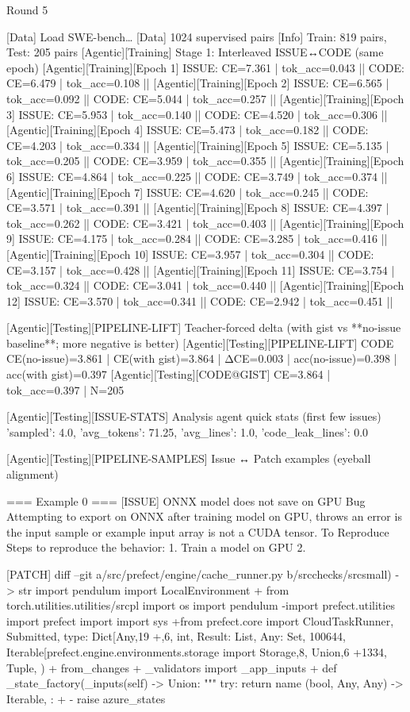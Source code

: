  Round 5
 
 [Data] Load SWE-bench…
 [Data] 1024 supervised pairs
 [Info] Train: 819 pairs, Test: 205 pairs
 [Agentic][Training] Stage 1: Interleaved ISSUE↔CODE (same epoch)
 [Agentic][Training][Epoch 1] ISSUE: CE=7.361 | tok_acc=0.043  ||  CODE: CE=6.479 | tok_acc=0.108  ||  
 [Agentic][Training][Epoch 2] ISSUE: CE=6.565 | tok_acc=0.092  ||  CODE: CE=5.044 | tok_acc=0.257  ||  
 [Agentic][Training][Epoch 3] ISSUE: CE=5.953 | tok_acc=0.140  ||  CODE: CE=4.520 | tok_acc=0.306  ||  
 [Agentic][Training][Epoch 4] ISSUE: CE=5.473 | tok_acc=0.182  ||  CODE: CE=4.203 | tok_acc=0.334  ||  
 [Agentic][Training][Epoch 5] ISSUE: CE=5.135 | tok_acc=0.205  ||  CODE: CE=3.959 | tok_acc=0.355  ||  
 [Agentic][Training][Epoch 6] ISSUE: CE=4.864 | tok_acc=0.225  ||  CODE: CE=3.749 | tok_acc=0.374  ||  
 [Agentic][Training][Epoch 7] ISSUE: CE=4.620 | tok_acc=0.245  ||  CODE: CE=3.571 | tok_acc=0.391  ||  
 [Agentic][Training][Epoch 8] ISSUE: CE=4.397 | tok_acc=0.262  ||  CODE: CE=3.421 | tok_acc=0.403  ||  
 [Agentic][Training][Epoch 9] ISSUE: CE=4.175 | tok_acc=0.284  ||  CODE: CE=3.285 | tok_acc=0.416  ||  
 [Agentic][Training][Epoch 10] ISSUE: CE=3.957 | tok_acc=0.304  ||  CODE: CE=3.157 | tok_acc=0.428  ||  
 [Agentic][Training][Epoch 11] ISSUE: CE=3.754 | tok_acc=0.324  ||  CODE: CE=3.041 | tok_acc=0.440  ||  
 [Agentic][Training][Epoch 12] ISSUE: CE=3.570 | tok_acc=0.341  ||  CODE: CE=2.942 | tok_acc=0.451  ||  
 
 [Agentic][Testing][PIPELINE-LIFT] Teacher-forced delta (with gist vs **no-issue baseline**; more negative is better)
 [Agentic][Testing][PIPELINE-LIFT] CODE CE(no-issue)=3.861 | CE(with gist)=3.864 | ΔCE=0.003 | acc(no-issue)=0.398 | acc(with gist)=0.397
 [Agentic][Testing][CODE@GIST] CE=3.864 | tok_acc=0.397 | N=205
 
 [Agentic][Testing][ISSUE-STATS] Analysis agent quick stats (first few issues)
 {'sampled': 4.0, 'avg_tokens': 71.25, 'avg_lines': 1.0, 'code_leak_lines': 0.0}
 
 [Agentic][Testing][PIPELINE-SAMPLES] Issue ↔ Patch examples (eyeball alignment)
 
 === Example 0 ===
 [ISSUE]
 ONNX model does not save on GPU Bug Attempting to export on ONNX after training model on GPU, throws an error is the input sample or example input array is not a CUDA tensor. To Reproduce Steps to reproduce the behavior: 1. Train a model on GPU 2.
 
 [PATCH]
 diff --git a/src/prefect/engine/cache_runner.py b/srcchecks/srcsmall) -> str import pendulum import LocalEnvironment + from torch.utilities.utilities/srcpl import os import pendulum -import prefect.utilities import prefect import import sys +from prefect.core import CloudTaskRunner, Submitted, type: Dict[Any,19 +,6, int, Result: List, Any: Set, 100644, Iterable[prefect.engine.environments.storage import Storage,8, Union,6 +1334, Tuple, ) + from_changes + _validators import _app_inputs + def _state_factory(_inputs(self) -> Union: """ try: return name (bool, Any, Any) -> Iterable, : + - raise azure_states
 

